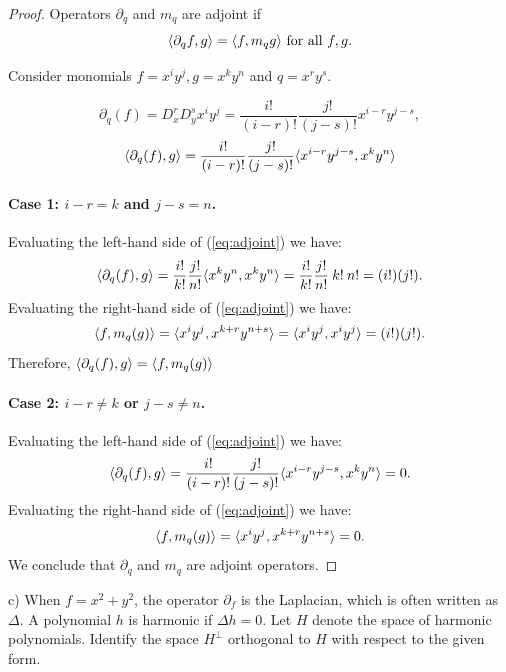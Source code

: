 \documentclass{article}
\theoremstyle{definition}
\DeclarePairedDelimiter\bilform{\langle}{\rangle}
\begin{document}
\begin{proof}

Operators $\partial_q$ and $m_q$ are adjoint if
\begin{equation} \label{eq:adjoint}
    \bilform{\partial_q f, g} = \bilform{f, m_q g} \text{ for all $f, g$}.
\end{equation}

Consider monomials $f = x^i y^j, g = x^k y^n$ and $q = x^r y^s$.

\[
    \partial_q (f)
    = D_x^r D_y^s x^i y^j
    = \frac{i!}{(i-r)!} \frac{j!}{(j-s)!} x^{i-r} y^{j-s},
\]
\[
    \bilform{\partial_q (f), g} 
    = \frac{i!}{(i-r)!} \frac{j!}{(j-s)!} \bilform{x^{i-r} y^{j-s}, x^k y^n}
\]

\paragraph{Case 1: $i-r = k$ and $j-s = n$.}
Evaluating the left-hand side of (\ref{eq:adjoint}) we have:
\[
    \bilform{\partial_q (f), g} 
    = \frac{i!}{k!} \frac{j!}{n!} \bilform{x^k y^n, x^k y^n}
    = \frac{i!}{k!} \frac{j!}{n!} \> k! \> n! 
    = (i!) (j!).
\]
Evaluating the right-hand side of (\ref{eq:adjoint}) we have:
\[
    \bilform{f, m_q(g)} 
    = \bilform{x^i y^j, x^{k+r} y^{n+s}}
    = \bilform{x^i y^j, x^i y^j}
    = (i!) (j!).
\]
Therefore, $\bilform{\partial_q (f), g} = \bilform{f, m_q(g)}$

\paragraph{Case 2: $i-r \neq k$ or $j-s \neq n$.}
Evaluating the left-hand side of (\ref{eq:adjoint}) we have:
\[
    \bilform{\partial_q (f), g} 
    = \frac{i!}{(i-r)!} \frac{j!}{(j-s)!} \bilform{x^{i-r} y^{j-s}, x^k y^n}
    = 0.
\]
Evaluating the right-hand side of (\ref{eq:adjoint}) we have:
\[
    \bilform{f, m_q(g)} 
    = \bilform{x^i y^j, x^{k+r} y^{n+s}}
    = 0.
\]
We conclude that $\partial_q$ and $m_q$ are adjoint operators.

\end{proof}


\begin{tcolorbox}
c) When $f = x^2 + y^2$, the operator $\partial_f$ is the Laplacian, which is often written as $\Delta$.
A polynomial $h$ is harmonic if $\Delta h = 0$.
Let $H$ denote the space of harmonic polynomials.
Identify the space $H^\perp$ orthogonal to $H$ with respect to the given form.
\end{tcolorbox}
\end{document}
